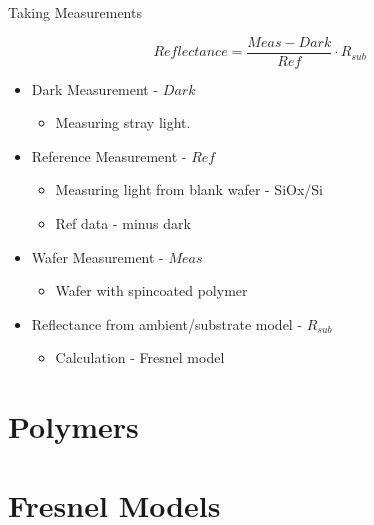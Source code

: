 \documentclass[10pt]{beamer}
\begin{document}
\begin{frame}{Taking Measurements}

\begin{equation*}
Reflectance = \frac{Meas-Dark}{Ref}\cdot R_{sub}
\end{equation*}

\begin{itemize}
\item Dark Measurement - $Dark$\\
\begin{itemize}
\item Measuring stray light.
\end{itemize}
\item Reference Measurement - $Ref$\\
\begin{itemize}
\item Measuring light from blank wafer - SiOx/Si
\item Ref data - minus dark
\end{itemize}
\item Wafer Measurement - $Meas$\\
\begin{itemize}
\item Wafer with spincoated polymer
\end{itemize}
\item Reflectance from ambient/substrate model - $R_{sub}$
\begin{itemize}
\item Calculation - Fresnel model
\end{itemize}
\end{itemize}

\end{frame}

	\section{Polymers}
	
	\section{Fresnel Models}
	
\end{document}
